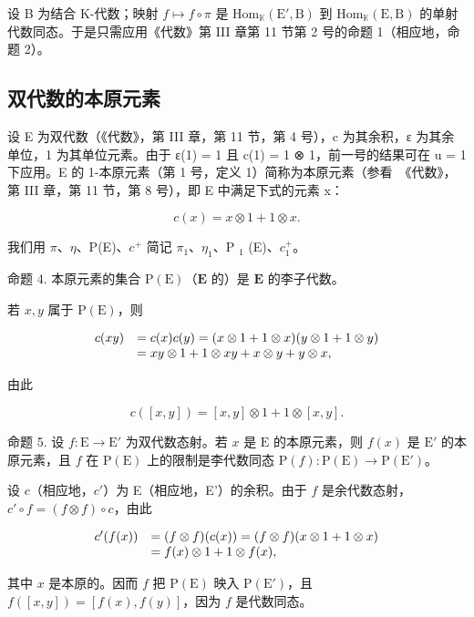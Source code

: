 设 B 为结合 K-代数；映射 \(f \mapsto f \circ \pi\) 是 \(\mathrm{Hom}_{\mathbb{K}}(\mathrm{E}', \mathrm{B})\) 到 \(\mathrm{Hom}_{\mathbb{K}}(\mathrm{E}, \mathrm{B})\) 的单射代数同态。于是只需应用《代数》第 III 章第 11 节第 2 号的命题 1（相应地，命题 2）。

\subsection{双代数的本原元素}

设 E 为双代数（《代数》，第 III 章，第 11 节，第 4 号），c 为其余积，ε 为其余单位，1 为其单位元素。由于 ε(1) = 1 且 c(1) = 1 ⊗ 1，前一号的结果可在 u = 1 下应用。E 的 1-本原元素（第 1 号，定义 1）简称为本原元素（参看~《代数》，第 III 章，第 11 节，第 8 号），即 E 中满足下式的元素 x：

\[
c (x) = x \otimes 1 + 1 \otimes x.\tag{5}
\]

我们用 \(\pi\)、\(\eta\)、P(E)、\(c^{+}\) 简记 \(\pi_{1}\)、\(\eta_{1}\)、P \(_{1}\) (E)、\(c_{1}^{+}\)。

命题 4. 本原元素的集合 \(\mathrm{P(E)}\)（\(\mathbf{E}\) 的）是 \(\mathbf{E}\) 的李子代数。

若 \(x, y\) 属于 \(\mathrm{P(E)}\)，则

\[
\begin{array}{r l} c (x y) & = c (x) c (y) = (x \otimes 1 + 1 \otimes x) (y \otimes 1 + 1 \otimes y) \\ & = x y \otimes 1 + 1 \otimes x y + x \otimes y + y \otimes x, \end{array}
\]

由此

\[
c ([ x, y ]) = [ x, y ] \otimes 1 + 1 \otimes [ x, y ].
\]

命题 5. 设 \(f: \mathrm{E} \to \mathrm{E}'\) 为双代数态射。若 \(x\) 是 \(\mathrm{E}\) 的本原元素，则 \(f(x)\) 是 \(\mathrm{E}'\) 的本原元素，且 \(f\) 在 \(\mathrm{P(E)}\) 上的限制是李代数同态 \(\mathrm{P}(f): \mathrm{P(E)} \to \mathrm{P(E')}\)。

设 \(c\)（相应地，\(c'\)）为 E（相应地，E'）的余积。由于 \(f\) 是余代数态射，\(c' \circ f = (f \otimes f) \circ c\)，由此

\[
\begin{array}{r l} c ^ {\prime} (f (x)) & = (f \otimes f) (c (x)) = (f \otimes f) (x \otimes 1 + 1 \otimes x) \\ & = f (x) \otimes 1 + 1 \otimes f (x), \end{array}
\]

其中 \(x\) 是本原的。因而 \(f\) 把 \(\mathrm{P(E)}\) 映入 \(\mathrm{P(E')}\)，且 \(f([x,y]) = [f(x),f(y)]\)，因为 \(f\) 是代数同态。

